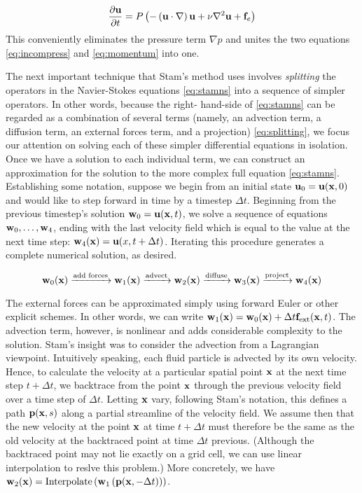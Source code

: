 \begin{equation}
\label{eq:stamns}
\frac{\partial \mathbf{u}}{\partial t} = P\left(-\left(\mathbf{u} \cdot \nabla \right)\mathbf{u} + \nu \nabla^{2}\mathbf{u} + \mathbf{f}_e\right)
\end{equation}
This conveniently eliminates the pressure term $\nabla p$ and unites the two equations \ref{eq:incompress} and \ref{eq:momentum} into one.

The next important technique that Stam's method uses involves {\em splitting} the operators in the Navier-Stokes equations \ref{eq:stamns} into a sequence of simpler operators. In other words, because the right-
hand-side of \ref{eq:stamns} can be regarded as a combination of several terms (namely, an advection term, a diffusion term, an external forces term, and a projection) \ref{eq:splitting}, we focus our attention on solving each of these simpler differential equations in isolation. Once we have a solution to each individual term, we can construct an approximation for the solution to the more complex full equation \ref{eq:stamns}. Establishing some notation, suppose we begin from an initial state $\mathbf{u}_0 = \mathbf{u}(\mathbf{x}, 0)$ and would like to step forward in time by a timestep $\Delta t$. Beginning from the previous timestep's solution $\mathbf{w}_0 = \mathbf{u}(\mathbf{x}, t)$, we solve a sequence of equations $\mathbf{w}_0, \dots, \mathbf{w}_4$, ending with the last velocity field which is equal to the value at the next time step: $\mathbf{w}_4(\mathbf{x}) = \mathbf{u}(x, t + \Delta t)$. Iterating this procedure generates a complete numerical solution, as desired.

\begin{equation}
\label{eq:splitting}
\mathbf{w}_0(\mathbf{x}) \xrightarrow{\text{add forces}} \mathbf{w}_1(\mathbf{x}) \xrightarrow{\text{advect}} \mathbf{w}_2(\mathbf{x}) \xrightarrow{\text{diffuse}} \mathbf{w}_3(\mathbf{x}) \xrightarrow{\text{project}} \mathbf{w}_4(\mathbf{x})
\end{equation}

The external forces can be approximated simply using forward Euler or other explicit schemes. In other words, we can write
$\mathbf{w}_1(\mathbf{x}) = \mathbf{w}_0(\mathbf{x}) + \Delta t \mathbf{f}_{\text{ext}}(\mathbf{x}, t)$. The advection term, however, is nonlinear and adds considerable complexity to the solution. Stam's insight was to consider the advection from a Lagrangian viewpoint. Intuitively speaking, each fluid particle is advected by its own velocity. Hence, to calculate the velocity at a particular spatial point $\mathbf{x}$ at the next time step $t + \Delta t$, we backtrace from the point $\mathbf{x}$ through the previous velocity field over a time step of $\Delta t$. Letting $\mathbf{x}$ vary, following Stam's notation, this defines a path $\mathbf{p}(\mathbf{x}, s)$ along a partial streamline of the velocity field. We assume then that the new velocity at the point $\mathbf{x}$ at time $t + \Delta t$ must therefore be the same as the old velocity at the backtraced point at time $\Delta t$ previous. (Although the backtraced point may not lie exactly on a grid cell, we can use linear interpolation to reslve this problem.) More concretely, we have $\mathbf{w}_2(\mathbf{x}) = \text{Interpolate}\left(\mathbf{w}_1\left(\mathbf{p}(\mathbf{x}, -\Delta t)\right)\right)$.

